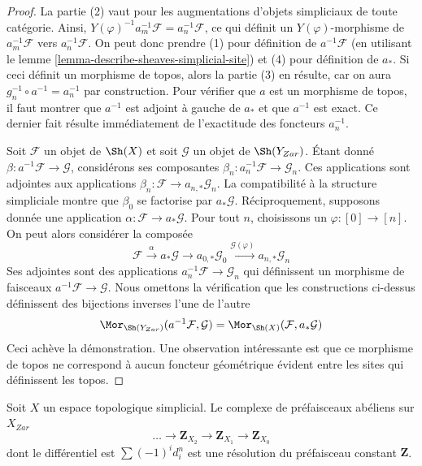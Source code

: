 \begin{proof}
La partie (2) vaut pour les augmentations d'objets simpliciaux de toute catégorie.
Ainsi, $Y(\varphi)^{-1} a_m^{-1} \mathcal{F} = a_n^{-1}\mathcal{F}$,
ce qui définit un $Y(\varphi)$-morphisme de $a_m^{-1}\mathcal{F}$
vers $a_n^{-1}\mathcal{F}$.
On peut donc prendre (1) pour définition de $a^{-1}\mathcal{F}$ (en utilisant le
lemme \ref{lemma-describe-sheaves-simplicial-site}) et
(4) pour définition de $a_*$. Si ceci définit un morphisme de topos,
alors la partie (3) en résulte, car on aura $g_n^{-1} \circ a^{-1} = a_n^{-1}$
par construction. Pour vérifier que $a$ est un morphisme de topos, il faut montrer
que $a^{-1}$ est adjoint à gauche de $a_*$ et
que $a^{-1}$ est exact. Ce dernier fait résulte immédiatement de l'exactitude des
foncteurs $a_n^{-1}$.

\medskip\noindent
Soit $\mathcal{F}$ un objet de $\Sh(X)$ et soit $\mathcal{G}$
un objet de $\Sh(Y_{Zar})$. Étant donné
$\beta : a^{-1}\mathcal{F} \to \mathcal{G}$, considérons ses
composantes $\beta_n : a_n^{-1}\mathcal{F} \to \mathcal{G}_n$.
Ces applications sont adjointes aux applications
$\beta_n : \mathcal{F} \to a_{n, *}\mathcal{G}_n$.
La compatibilité à la structure simpliciale montre que
$\beta_0$ se factorise par $a_*\mathcal{G}$.
Réciproquement, supposons donnée une application $\alpha : \mathcal{F} \to a_*\mathcal{G}$.
Pour tout $n$, choisissons un $\varphi : [0] \to [n]$. On peut alors considérer
la composée
$$
\mathcal{F} \xrightarrow{\alpha} a_*\mathcal{G}
\to a_{0, *}\mathcal{G}_0 \xrightarrow{\mathcal{G}(\varphi)}
a_{n, *}\mathcal{G}_n
$$
Ses adjointes sont des applications $a_n^{-1}\mathcal{F} \to \mathcal{G}_n$
qui définissent un morphisme de faisceaux $a^{-1}\mathcal{F} \to \mathcal{G}$.
Nous omettons la vérification que les constructions ci-dessus définissent
des bijections inverses l'une de l'autre
$$
\Mor_{\Sh(Y_{Zar})}(a^{-1}\mathcal{F}, \mathcal{G}) =
\Mor_{\Sh(X)}(\mathcal{F}, a_*\mathcal{G})
$$
Ceci achève la démonstration. Une observation intéressante est que
ce morphisme de topos ne correspond à aucun foncteur géométrique évident
entre les sites qui définissent les topos.
\end{proof}

\begin{lemma}
\label{lemma-simplicial-resolution-Z}
Soit $X$ un espace topologique simplicial. Le complexe de
préfaisceaux abéliens sur $X_{Zar}$
$$
\ldots \to \mathbf{Z}_{X_2} \to \mathbf{Z}_{X_1} \to \mathbf{Z}_{X_0}
$$
dont le différentiel est $\sum (-1)^i d^n_i$ est une résolution
du préfaisceau constant $\mathbf{Z}$.
\end{lemma}

